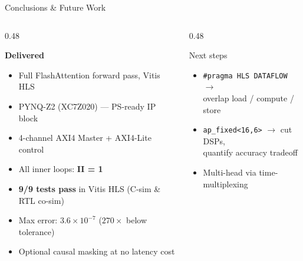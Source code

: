 \documentclass[aspectratio=169, 10pt]{beamer}
\newcommand{\good}[1]{{\color{GoodGrn}\textbf{#1}}}
\begin{document}
\begin{frame}{Conclusions \& Future Work}
  \begin{columns}[T]
    \begin{column}{0.48\textwidth}
      \begin{block}{\good{Delivered}}
        \vspace{2pt}
        \begin{itemize}\setlength\itemsep{3pt}
          \item Full FlashAttention forward pass, Vitis HLS
          \item PYNQ-Z2 (XC7Z020) --- PS-ready IP block
          \item 4-channel AXI4 Master + AXI4-Lite control
          \item All inner loops: \good{II = 1}
          \item \good{9/9 tests pass} in Vitis HLS (C-sim \& RTL co-sim)
          \item Max error: $3.6\times10^{-7}$
                ($270\times$ below tolerance)
          \item Optional causal masking at no latency cost
        \end{itemize}
        \vspace{2pt}
      \end{block}
    \end{column}
    \begin{column}{0.48\textwidth}
      \begin{block}{Next steps}
        \vspace{2pt}
        \begin{itemize}\setlength\itemsep{2pt}
          \item \texttt{\#pragma HLS DATAFLOW} $\to$\\
                overlap load / compute / store
          \item \texttt{ap\_fixed<16,6>} $\to$ cut DSPs,\\
                quantify accuracy tradeoff
          \item Multi-head via time-multiplexing
        \end{itemize}
        \vspace{2pt}
      \end{block}
    \end{column}
  \end{columns}
\end{frame}
\end{document}
